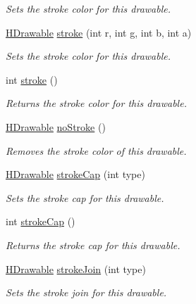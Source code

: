 \begin{DoxyCompactItemize}
\begin{DoxyCompactList}\small\item\em Sets the stroke color for this drawable. \end{DoxyCompactList}\item 
\hyperlink{classhype_1_1drawable_1_1_h_drawable}{H\-Drawable} \hyperlink{classhype_1_1drawable_1_1_h_drawable_af93bbe886c7d0b75eaab965d9a4b585c}{stroke} (int r, int g, int b, int a)
\begin{DoxyCompactList}\small\item\em Sets the stroke color for this drawable. \end{DoxyCompactList}\item 
int \hyperlink{classhype_1_1drawable_1_1_h_drawable_a71c0f994e78e4abca14513d48e014ee6}{stroke} ()
\begin{DoxyCompactList}\small\item\em Returns the stroke color for this drawable. \end{DoxyCompactList}\item 
\hyperlink{classhype_1_1drawable_1_1_h_drawable}{H\-Drawable} \hyperlink{classhype_1_1drawable_1_1_h_drawable_a7113d13660848a820f1d7661e16d34e8}{no\-Stroke} ()
\begin{DoxyCompactList}\small\item\em Removes the stroke color of this drawable. \end{DoxyCompactList}\item 
\hyperlink{classhype_1_1drawable_1_1_h_drawable}{H\-Drawable} \hyperlink{classhype_1_1drawable_1_1_h_drawable_a494dc825c3023645aedb917e1817b000}{stroke\-Cap} (int type)
\begin{DoxyCompactList}\small\item\em Sets the stroke cap for this drawable. \end{DoxyCompactList}\item 
int \hyperlink{classhype_1_1drawable_1_1_h_drawable_aa0881e861ef7eda3d2d554d64b63bfa6}{stroke\-Cap} ()
\begin{DoxyCompactList}\small\item\em Returns the stroke cap for this drawable. \end{DoxyCompactList}\item 
\hyperlink{classhype_1_1drawable_1_1_h_drawable}{H\-Drawable} \hyperlink{classhype_1_1drawable_1_1_h_drawable_a0b54f1607c1e0d5366f9f84b1ff0b761}{stroke\-Join} (int type)
\begin{DoxyCompactList}\small\item\em Sets the stroke join for this drawable. \end{DoxyCompactList}\item 

\end{DoxyCompactItemize}
